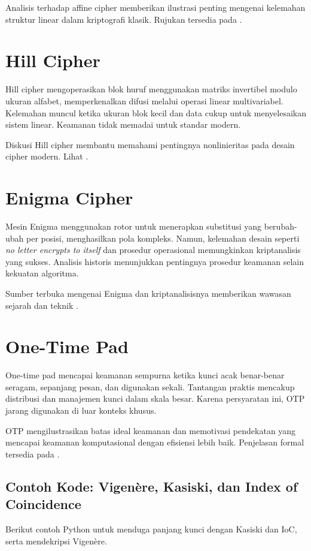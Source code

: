 \documentclass[../main.tex]{subfiles}
\begin{document}
Analisis terhadap affine cipher memberikan ilustrasi penting mengenai kelemahan struktur linear dalam kriptografi klasik. Rujukan tersedia pada \textcite{menezes1996handbook}.

\section{Hill Cipher}
Hill cipher mengoperasikan blok huruf menggunakan matriks invertibel modulo ukuran alfabet, memperkenalkan difusi melalui operasi linear multivariabel. Kelemahan muncul ketika ukuran blok kecil dan data cukup untuk menyelesaikan sistem linear. Keamanan tidak memadai untuk standar modern.

Diskusi Hill cipher membantu memahami pentingnya nonlinieritas pada desain cipher modern. Lihat \textcite{menezes1996handbook}.

\section{Enigma Cipher}
Mesin Enigma menggunakan rotor untuk menerapkan substitusi yang berubah-ubah per posisi, menghasilkan pola kompleks. Namun, kelemahan desain seperti \emph{no letter encrypts to itself} dan prosedur operasional memungkinkan kriptanalisis yang sukses. Analisis historis menunjukkan pentingnya prosedur keamanan selain kekuatan algoritma.

Sumber terbuka mengenai Enigma dan kriptanalisisnya memberikan wawasan sejarah dan teknik \parencite{menezes1996handbook}.

\section{One-Time Pad}
One-time pad mencapai keamanan sempurna ketika kunci acak benar-benar seragam, sepanjang pesan, dan digunakan sekali. Tantangan praktis mencakup distribusi dan manajemen kunci dalam skala besar. Karena persyaratan ini, OTP jarang digunakan di luar konteks khusus.

OTP mengilustrasikan batas ideal keamanan dan memotivasi pendekatan yang mencapai keamanan komputasional dengan efisiensi lebih baik. Penjelasan formal tersedia pada \textcite{menezes1996handbook}.

\subsection{Contoh Kode: Vigenère, Kasiski, dan Index of Coincidence}
Berikut contoh Python untuk menduga panjang kunci dengan Kasiski dan IoC, serta mendekripsi Vigenère.
\end{document}
